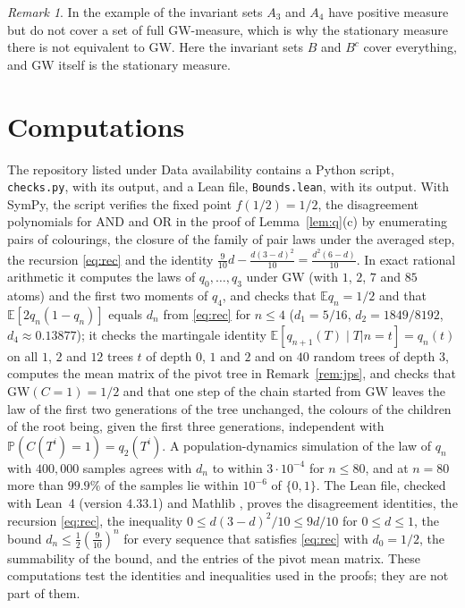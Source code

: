 \documentclass[11pt]{amsart}
\theoremstyle{remark}
\newtheorem{remark}{Remark}
\numberwithin{equation}{section}
\newcommand{\Pp}{\mathbb P}
\newcommand{\E}{\mathbb E}
\newcommand{\GW}{\mathrm{GW}}
\begin{document}
\begin{remark}
In the example of \cite[Exercise~17.22]{LP} the invariant sets $A_3$ and $A_4$ have positive measure but do not cover a set of full $\GW$-measure, which is why the stationary measure there is not equivalent to $\GW$. Here the invariant sets $B$ and $B^c$ cover everything, and $\GW$ itself is the stationary measure.
\end{remark}

\section{Computations}\label{sec:checks}

The repository listed under Data availability contains a Python script, \texttt{checks.py}, with its output, and a Lean file, \texttt{Bounds.lean}, with its output. With SymPy, the script verifies the fixed point $f(1/2)=1/2$, the disagreement polynomials for AND and OR in the proof of Lemma~\ref{lem:q}(c) by enumerating pairs of colourings, the closure of the family of pair laws under the averaged step, the recursion \eqref{eq:rec} and the identity $\frac9{10}d-\frac{d(3-d)^2}{10}=\frac{d^2(6-d)}{10}$. In exact rational arithmetic it computes the laws of $q_0,\dots,q_3$ under $\GW$ (with $1$, $2$, $7$ and $85$ atoms) and the first two moments of $q_4$, and checks that $\E q_n=1/2$ and that $\E[2q_n(1-q_n)]$ equals $d_n$ from \eqref{eq:rec} for $n\le4$ ($d_1=5/16$, $d_2=1849/8192$, $d_4\approx0.13877$); it checks the martingale identity $\E[q_{n+1}(T)\mid T|n=t]=q_n(t)$ on all $1$, $2$ and $12$ trees $t$ of depth $0$, $1$ and $2$ and on $40$ random trees of depth $3$, computes the mean matrix of the pivot tree in Remark~\ref{rem:jps}, and checks that $\GW(C=1)=1/2$ and that one step of the chain started from $\GW$ leaves the law of the first two generations of the tree unchanged, the colours of the children of the root being, given the first three generations, independent with $\Pp(C(T^i)=1)=q_2(T^i)$. A population-dynamics simulation of the law of $q_n$ with $400{,}000$ samples agrees with $d_n$ to within $3\cdot10^{-4}$ for $n\le80$, and at $n=80$ more than $99.9\%$ of the samples lie within $10^{-6}$ of $\{0,1\}$. The Lean file, checked with Lean~4 \cite{MU21} (version 4.33.1) and Mathlib \cite{Mathlib20}, proves the disagreement identities, the recursion \eqref{eq:rec}, the inequality $0\le d(3-d)^2/10\le9d/10$ for $0\le d\le1$, the bound $d_n\le\frac12(\frac9{10})^n$ for every sequence that satisfies \eqref{eq:rec} with $d_0=1/2$, the summability of the bound, and the entries of the pivot mean matrix. These computations test the identities and inequalities used in the proofs; they are not part of them.
\end{document}
